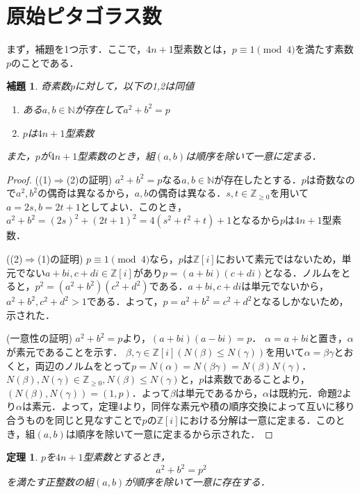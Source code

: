\documentclass[dvipdfmx]{jsarticle}
\newtheorem*{theorem*}{定理}
\newtheorem*{lemma*}{補題}
\begin{document}
\section{原始ピタゴラス数}

まず，補題を1つ示す．ここで，$4n+1$型素数とは，$p\equiv 1\pmod 4$を満たす素数$p$のことである．

\begin{lemma*}
奇素数$p$に対して，以下の1,2は同値
\begin{enumerate}
 \item ある$a,b\in\mathbb{N}$が存在して$a^2+b^2=p$\\
 \item $p$は$4n+1$型素数
\end{enumerate}
また，$p$が$4n+1$型素数のとき，組$(a,b)$は順序を除いて一意に定まる．
\end{lemma*}

\begin{proof}

((1)$\Longrightarrow$(2)の証明)
$a^2+b^2=p$なる$a,b\in\mathbb{N}$が存在したとする．$p$は奇数なので$a^2,b^2$の偶奇は異なるから，$a,b$の偶奇は異なる．$s,t\in\mathbb{Z}_{\geq0}$を用いて$a=2s,b=2t+1$としてよい．このとき，$a^2+b^2=(2s)^2+(2t+1)^2=4(s^2+t^2+t)+1$となるから$p$は$4n+1$型素数．

((2)$\Longrightarrow$(1)の証明)
$p\equiv1\pmod4$なら，$p$は$\mathbb{Z}[i]$において素元ではないため，単元でない$a+bi,c+di\in\mathbb{Z}[i]$があり$p=(a+bi)(c+di)$となる．ノルムをとると，$p^2=(a^2+b^2)(c^2+d^2)$である．$a+bi,c+di$は単元でないから，$a^2+b^2,c^2+d^2>1$である．よって，$p=a^2+b^2=c^2+d^2$となるしかないため，示された．


(一意性の証明)
$a^2+b^2=p$より，$(a+bi)(a-bi)=p$．
$\alpha=a+bi$と置き，$\alpha$が素元であることを示す．
$\beta,\gamma\in\mathbb{Z}[i](N(\beta)\leq N(\gamma))$を用いて$\alpha=\beta\gamma$とおくと，両辺のノルムをとって$p=N(\alpha)=N(\beta\gamma)=N(\beta)N(\gamma)$．$N(\beta),N(\gamma)\in\mathbb{Z}_{\geq0},N(\beta)\leq N(\gamma)$と，$p$は素数であることより，$(N(\beta),N(\gamma))=(1,p)$．よって$\beta$は単元であるから，$\alpha$は既約元．命題2より$\alpha$は素元．よって，定理4より，同伴な素元や積の順序交換によって互いに移り合うものを同じと見なすことで$p$の$\mathbb{Z}[i]$における分解は一意に定まる．このとき，組$(a,b)$は順序を除いて一意に定まるから示された．
\end{proof}


\begin{theorem*}
$p$を$4n+1$型素数とするとき，
$$a^2+b^2=p^2$$
を満たす正整数の組$(a,b)$が順序を除いて一意に存在する．
\end{theorem*}
\end{document}
